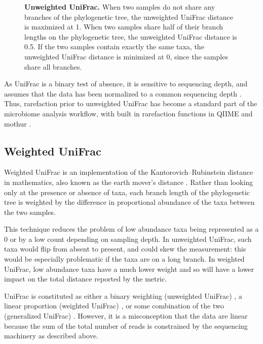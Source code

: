 \documentclass[10pt,letterpaper]{article}
\begin{document}
\begin{figure}[h]
\caption[Unweighted UniFrac.]{{\bf Unweighted UniFrac.}
When two samples do not share any branches of the phylogenetic tree, the unweighted UniFrac distance is maximized at 1. When two samples share half of their branch lengths on the phylogenetic tree, the unweighted UniFrac distance is 0.5. If the two samples contain exactly the same taxa, the unweighted UniFrac distance is minimized at 0, since the samples share all branches.}
\label{fig1}
\end{figure}

As UniFrac is a binary test of absence, it is sensitive to sequencing depth, and assumes that the data has been normalized to a common sequencing depth \cite{lozupone2011unifrac}. Thus, rarefaction prior to unweighted UniFrac has become a standard part of the microbiome analysis workflow, with built in rarefaction functions in QIIME \cite{caporaso2010qiime} and mothur \cite{schloss2009introducing}.

\FloatBarrier

\subsection{Weighted UniFrac}
Weighted UniFrac \cite{lozupone2007quantitative} is an implementation of the Kantorovich–Rubinstein distance in mathematics, also known as the earth mover’s distance \cite{evans2012phylogenetic}. Rather than looking only at the presence or absence of taxa, each branch length of the phylogenetic tree is weighted by the difference in proportional abundance of the taxa between the two samples.

This technique reduces the problem of low abundance taxa being represented as a 0 or by a low count depending on sampling depth. In unweighted UniFrac, such taxa would flip from absent to present, and could skew the measurement: this would be especially problematic if the taxa are on a long branch. In weighted UniFrac, low abundance taxa have a much lower weight and so will have a lower impact on the total distance reported by the metric.

UniFrac is constituted as either a binary weighting (unweighted UniFrac) \cite{lozupone2005unifrac}, a linear proportion (weighted UniFrac) \cite{lozupone2007quantitative}, or some combination of the two (generalized UniFrac) \cite{chen2012associating}. However, it is a misconception that the data are linear because the sum of the total number of reads is constrained by the sequencing machinery \cite{friedman2012inferring} \cite{fernandes2013anova} \cite{fernandes2014unifying} \cite{lovell2015proportionality} as described above.
\end{document}
